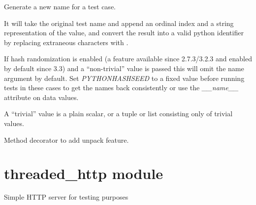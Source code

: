 \documentclass[letterpaper,10pt,english]{sphinxmanual}
\begin{document}

\begin{fulllineitems}
\label{ddt:ddt.is_hash_randomized}
\end{fulllineitems}


\begin{fulllineitems}
\label{ddt:ddt.mk_test_name}
Generate a new name for a test case.

It will take the original test name and append an ordinal index and a
string representation of the value, and convert the result into a valid
python identifier by replacing extraneous characters with \code{\_}.

If hash randomization is enabled (a feature available since 2.7.3/3.2.3
and enabled by default since 3.3) and a ``non-trivial'' value is passed
this will omit the name argument by default. Set \emph{PYTHONHASHSEED}
to a fixed value before running tests in these cases to get the
names back consistently or use the \emph{\_\_name\_\_} attribute on data values.

A ``trivial'' value is a plain scalar, or a tuple or list consisting
only of trivial values.

\end{fulllineitems}


\begin{fulllineitems}
\label{ddt:ddt.unpack}
Method decorator to add unpack feature.

\end{fulllineitems}



\section{threaded\_http module}
\label{threaded_http:threaded-http-module}\label{threaded_http::doc}\label{threaded_http:module-threaded_http}
Simple HTTP server for testing purposes
\end{document}
